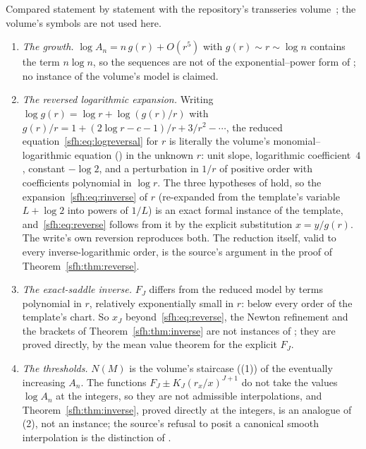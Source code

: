 \begin{remark}\label{sfh:rem:transseries}
Compared statement by statement with the repository's transseries
volume~\cite{TSvol}; the volume's symbols are not used here.
\begin{enumerate}\raggedright
\item \emph{The growth.} $\log A_n=n\,g(r)+O(r^5)$ with $g(r)\sim r\sim\log n$
contains the term $n\log n$, so the sequences are not of the
exponential--power form of ; no instance of the volume's
model is claimed.
\item \emph{The reversed logarithmic expansion.} Writing
$\log g(r)=\log r+\log(g(r)/r)$ with
$g(r)/r=1+(2\log r-c-1)/r+3/r^2-\cdots$, the reduced
equation~\eqref{sfh:eq:logreversal} for $r$ is literally the volume's
monomial--logarithmic equation () in the
unknown $r$: unit slope, logarithmic coefficient~$4$, constant $-\log2$, and a
perturbation in $1/r$ of positive order with coefficients polynomial in
$\log r$. The three hypotheses of  hold, so the
expansion~\eqref{sfh:eq:rinverse} of $r$ (re-expanded from the template's
variable $L+\log2$ into powers of $1/L$) is an exact formal instance of the
template, and~\eqref{sfh:eq:reverse} follows from it by the explicit
substitution $x=y/g(r)$. The write's own reversion reproduces both. The
reduction itself, valid to every inverse-logarithmic order, is the source's
argument in the proof of Theorem~\ref{sfh:thm:reverse}.
\item \emph{The exact-saddle inverse.} $F_J$ differs from the reduced model
by terms polynomial in $r$, relatively exponentially small in $r$: below every
order of the template's chart. So $x_J$ beyond~\eqref{sfh:eq:reverse}, the
Newton refinement and the brackets of Theorem~\ref{sfh:thm:inverse} are not
instances of ; they are proved directly, by the
mean value theorem for the explicit $F_J$.
\item \emph{The thresholds.} $N(M)$ is the volume's staircase
((1)) of the eventually increasing $A_n$. The
functions $F_J\pm K_J(r_x/x)^{J+1}$ do not take the values $\log A_n$ at the
integers, so they are not admissible interpolations, and
Theorem~\ref{sfh:thm:inverse}, proved directly at the integers, is an
analogue of (2), not an instance; the source's refusal
to posit a canonical smooth interpolation is the distinction of
.
\end{enumerate}
\end{remark}
